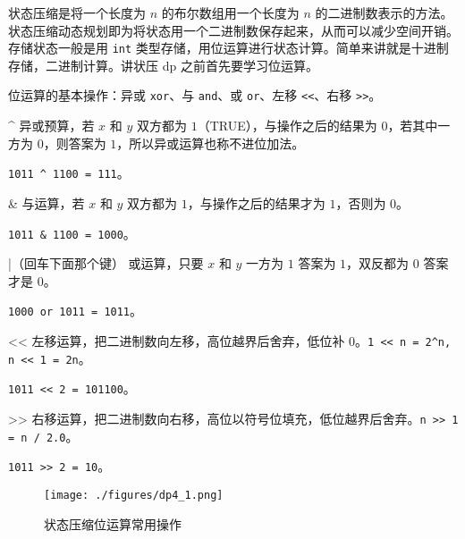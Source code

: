 
状态压缩是将一个长度为 $n$ 的布尔数组用一个长度为 $n$ 的二进制数表示的方法。状态压缩动态规划即为将状态用一个二进制数保存起来，从而可以减少空间开销。存储状态一般是用 \verb|int| 类型存储，用位运算进行状态计算。简单来讲就是十进制存储，二进制计算。讲状压 dp 之前首先要学习位运算。

位运算的基本操作：异或 \verb|xor|、与 \verb|and|、或 \verb|or|、左移 \verb|<<|、右移 \verb|>>|。

^ 异或预算，若 $x$ 和 $y$ 双方都为 $1$（TRUE），与操作之后的结果为 $0$，若其中一方为 $0$，则答案为 $1$，所以异或运算也称不进位加法。

\verb|1011 ^ 1100 = 111|。

& 与运算，若 $x$ 和 $y$ 双方都为 $1$，与操作之后的结果才为 $1$，否则为 $0$。

\verb|1011 & 1100 = 1000|。

|（回车下面那个键） 或运算，只要 $x$ 和 $y$ 一方为 $1$ 答案为 $1$，双反都为 $0$ 答案才是 $0$。

\verb|1000 or 1011 = 1011|。

<< 左移运算，把二进制数向左移，高位越界后舍弃，低位补 $0$。\verb|1 << n = 2^n, n << 1 = 2n|。

\verb|1011 << 2 = 101100|。

>> 右移运算，把二进制数向右移，高位以符号位填充，低位越界后舍弃。\verb|n >> 1 = n / 2.0|。

\verb|1011 >> 2 = 10|。

\begin{figure}[ht]
\centering
\texttt{[image: ./figures/dp4\_1.png]}
\caption{状态压缩位运算常用操作} \label{dp4_fig1}
\end{figure}
